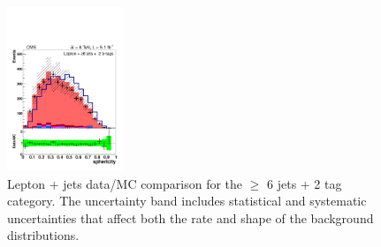 \begin{figure}[hbtp]
\begin{center}
   \includegraphics[width=0.31\textwidth]{Figures/Analysis_1_Diagrams/d2MCPlots_sphericity_cut3_jge6_t2_Combined_HtWgt.pdf}
   \hspace{0.055\textwidth}
   \caption{Lepton + jets data/MC comparison for the $\ge$ 6 jets + 2 tag category.  The uncertainty band includes statistical and systematic uncertainties that affect both the rate and shape of the background distributions.}
   \label{fig:lj_input_6j_2t_part2}
 \end{center}
\end{figure}


%
%

\clearpage

